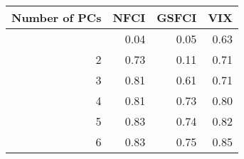 \begingroup
\fontsize{12.0pt}{14.4pt}\selectfont
\begin{tabular}{rrrr}
\toprule
Number of PCs & NFCI & GSFCI & VIX \\ 
\midrule\addlinespace[2.5pt]
1 & 0.04 & 0.05 & 0.63 \\ 
2 & 0.73 & 0.11 & 0.71 \\ 
3 & 0.81 & 0.61 & 0.71 \\ 
4 & 0.81 & 0.73 & 0.80 \\ 
5 & 0.83 & 0.74 & 0.82 \\ 
6 & 0.83 & 0.75 & 0.85 \\ 
\bottomrule
\end{tabular}
\endgroup

